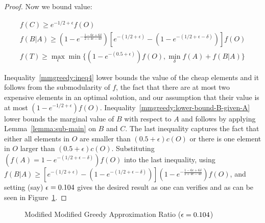 \begin{proof}
Now we bound value:

\begin{align}
	\label{mmgreedy:ineq4}
	f(C) \geq e^{-1/2 + \epsilon}f(O)
	\\
	\label{mmgreedy:lower-bound-B-given-A}
	f(B|A) \geq 
	(1-e^{-\frac{1-6\epsilon+6\delta}{2+4\epsilon-4\delta}})
	\left[
	e^{-(1/2 + \epsilon)}
	- (1 - e^{-(1/2 + \epsilon - \delta)})
	\right]f(O)
	\\
	\label{mmgreedy:ineq7}
	f(T) \geq \max_\epsilon \min \{(1 - e^{-(0.5 + \epsilon)})f(O), \min_{\delta} f(A) + f(B|A)\}
\end{align}

Inequality~\ref{mmgreedy:ineq4} lower bounds the value of the cheap elements and it follows from the submodularity of $f$, the fact that there are at most two expensive elements in an optimal solution, and our assumption that their value is at most $(1 - e^{-1/2 + \epsilon})f(O)$.
% 
Inequality~\ref{mmgreedy:lower-bound-B-given-A} lower bounds the marginal value of $B$ with respect to $A$ and follows by applying Lemma~\ref{lemma:sub-main} on $B$ and $C$.
% 
The last inequality captures the fact that either all elements in $O$ are smaller than
$(0.5 + \epsilon)c(O)$ or there is one element in $O$ larger than $(0.5 + \epsilon)c(O)$.
% 
Substituting $(f(A) = 1 - e^{-(1/2 + \epsilon - \delta)})f(O)$ into the last inequality, using $f(B|A) \ge \left[
e^{-(1/2 + \epsilon)}
- (1 - e^{-(1/2 + \epsilon - \delta)})
\right]
(1-e^{-\frac{1-6\epsilon+6\delta}{2+4\epsilon-4\delta}})f(O)$,
and setting (say) $\epsilon = 0.104$ gives the desired result 
as one can verifies and as can be seen in Figure~\ref{fig:mmgreedy}.

\end{proof}

\begin{figure}
\caption{
\label{fig:mmgreedy}
Modified Modified Greedy Approximation Ratio ($\epsilon = 0.104$)
}
\end{figure}

